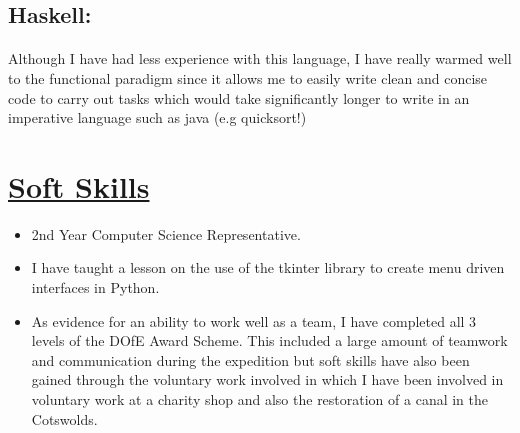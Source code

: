 \documentclass[11pt]{article}
\begin{document}
		\subsection*{Haskell:}
			\paragraph{}
			Although I have had less experience with this language, I have really warmed well to the functional paradigm since it allows me to easily write clean and concise code to carry out tasks which would take significantly longer to write in an imperative language such as java (e.g quicksort!)

	\vspace{-5pt}
	\hspace{-100pt}\section*{\underline{Soft Skills}}
		\begin{itemize}
			\item 2nd Year Computer Science Representative.
			\item I have taught a lesson on the use of the tkinter library to create menu driven interfaces in Python.
			\item As evidence for an ability to work well as a team, I have completed all 3 levels of the DOfE Award Scheme. This included a large amount of teamwork and communication during the expedition but soft skills have also been gained through the voluntary work involved in which I have been involved in voluntary work at a charity shop and also the restoration of a canal in the Cotswolds.
		\end{itemize}
	
\end{document}
